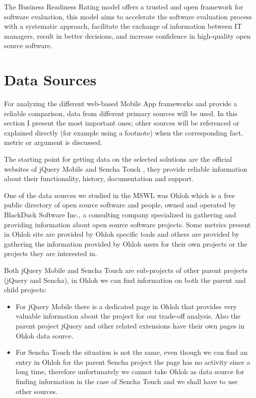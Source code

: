 \documentclass[a4paper,12pt]{book}
\begin{document}
The Business Readiness Rating model offers a trusted and open framework for software evaluation, this model aims to accelerate the software evaluation process with a systematic approach, facilitate the exchange of information between IT managers, result in better decisions, and increase confidence in high-quality open source software.

\section{Data Sources}
\label{sec:data}

For analyzing the different web-based Mobile App frameworks and provide a reliable comparison, data from different primary sources will be used. In this section I present the most important ones; other sources will be referenced or explained directly (for example using a footnote) when the corresponding fact, metric or argument is discussed.

The starting point for getting data on the selected solutions are the official websites of jQuery Mobile\cite{jquery} and Sencha Touch\cite{sencha} , they provide reliable information about their functionality, history, documentation and support. 

One of the data sources we studied in the MSWL was Ohloh\cite{Ohloh} which is a free public
directory of open source software and people, owned and operated by BlackDuck Software Inc., a consulting company specialized in gathering and providing information about open source software projects. Some metrics present in Ohloh site are provided by Ohloh specific tools and others are provided by gathering the information provided by Ohloh users for their own projects or the projects they are interested in.

Both jQuery Mobile and Sencha Touch are sub-projects of other parent projects (jQuery and Sencha), in Ohloh we can find information on both the parent and child projects:

\begin{itemize}
 \item For jQuery Mobile there is a dedicated page in Ohloh\cite{ojquery} that provides very valuable information about the project for our trade-off analysis. Also the parent project jQuery\cite{ojqueryparent} and other related extensions have their own pages in Ohloh data source.
 \item For Sencha Touch the situation is not the same, even though we can find an entry in Ohloh for the parent Sencha project\cite{osencha} the page has no activity since a long time, therefore unfortunately we cannot take Ohloh as data source for finding information in the case of Sencha Touch and we shall have to use other sources.
\end{itemize}
\end{document}
